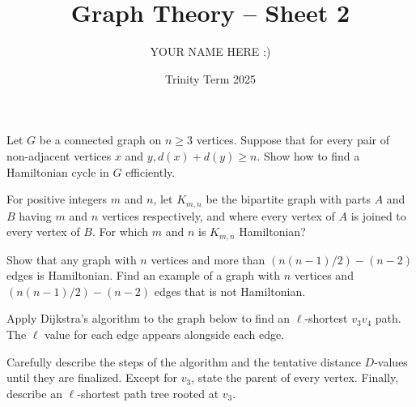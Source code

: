 \documentclass[answers]{exam}
\title{Graph Theory -- Sheet 2}
\author{YOUR NAME HERE :)}
\date{Trinity Term 2025}
\begin{document}
\maketitle
\begin{questions}

\question%
Let $G$ be a connected graph on $n \geqslant 3$ vertices. Suppose that for every pair of non-adjacent vertices $x$ and $y, d(x)+d(y) \geqslant n$. Show how to find a Hamiltonian cycle in $G$ efficiently.



\question%
For positive integers $m$ and $n$, let $K_{m, n}$ be the bipartite graph with parts $A$ and $B$ having $m$ and $n$ vertices respectively, and where every vertex of $A$ is joined to every vertex of $B$. For which $m$ and $n$ is $K_{m, n}$ Hamiltonian?



\question%
Show that any graph with $n$ vertices and more than $(n(n-1) / 2)-(n-2)$ edges is Hamiltonian. Find an example of a graph with $n$ vertices and $(n(n-1) / 2)-(n-2)$ edges that is not Hamiltonian.



\question%
Apply Dijkstra's algorithm to the graph below to find an $\ell$-shortest $v_{3} v_{4}$ path. The $\ell$ value for each edge appears alongside each edge.
\begin{center}\end{center}
Carefully describe the steps of the algorithm and the tentative distance $D$-values until they are finalized. Except for $v_{3}$, state the parent of every vertex. Finally, describe an $\ell$-shortest path tree rooted at $v_{3}$.




\end{questions}
\end{document}
